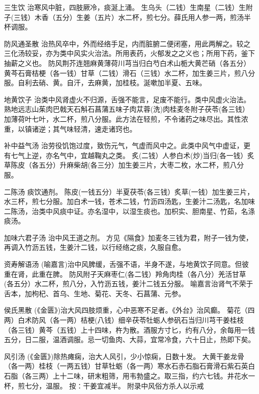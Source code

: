 \documentclass[a4paper,12pt,UTF8,twoside]{ctexbook}
\begin{document}
    三生饮
    治寒风中脏，四肢厥冷，痰涎上涌。
    生乌头（二钱）生南星（二钱）生附子(三钱）木香（五分）生姜（五片）水二杯，煎七分。薛氏用人参一两，煎汤半杯调服。
    
    防风通圣散
    治热风卒中，外而经络手足，内而脏腑二便闭塞，用此两解之。较之三化汤较妥，亦为类中风实火治法。所用表药，火郁发之之义也；所用下药，釜下抽薪之义也。
    防风荆芥连翘麻黄薄荷川芎当归白芍白术山栀大黄芒硝（各五分）黄芩石膏桔梗（各一钱）甘草（二钱）滑石（三钱）水二杯，加生姜三片，煎八分服。自利去硝、黄。自汗，去麻黄，加桂枝。涎嗽加半夏、五味。
    
    地黄饮子
    治类中风肾虚火不归源，舌强不能言，足废不能行。类中风虚火治法。
    熟地远志山茱肉巴戟天石斛石菖蒲五味子肉苁蓉(洗)肉桂麦冬附子茯苓(各三钱）加薄荷叶七叶，水二杯，煎八分服。此方法在轻煎，不令诸药之味尽出。其性浓重，以镇诸逆；其气味轻清，速走诸窍也。
    
    补中益气汤
    治劳役饥饱过度，致伤元气，气虚而风中之。此类中风气中虚证，更有七气上逆，亦名气中，宜越鞠丸之类。
    炙(二钱）人参白术(炒)当归(各一钱）炙草陈皮（各五分）升麻柴胡(各三分）加生姜三片，大枣二枚，水二杯，煎八分服。
    
    二陈汤
    痰饮通剂。
    陈皮(一钱五分）半夏茯苓(各三钱）炙草(一钱）加生姜三片，水三杯，煎七分服。加白术一钱，苍术二钱，竹沥四汤匙，生姜汁二汤匙，名加味二陈汤，治类中风痰中证。亦名湿中，以湿生痰也。加枳实、胆南星、竹茹，名涤痰汤。
    
    加味六君子汤
    治中风王道之剂。
    方见《隔食》加麦冬三钱为君，附子一钱为使，再调入竹沥五钱，生姜汁二钱，以行经络之痰，久服自愈。
    
    资寿解语汤
    (喻嘉言)治中风脾缓，舌强不语，半身不遂，与地黄饮子同意。但彼重在肾，此重在脾。
    防风附子天麻枣仁(各二钱）羚角肉桂（各八分）羌活甘草(各五分）水二杯，煎八分，入竹沥五钱，姜汁二钱五分服。
    喻嘉言治肾气不荣于舌本，加枸杞、首乌、生地、菊花、天冬、石菖蒲、元参。
    
    侯氏黑散
    (《金匮》)治大风四肢烦重，心中恶寒不足者。《外台》治风癫。
    菊花（四两）白术防风（各一两）桔梗(八钱）细辛茯苓牡蛎人参矾石当归川芎干姜桂枝（各三钱）黄芩（五钱）上十四味，杵为散。酒服方寸匕，约有八分，余每用一钱五分，日二服，温酒调服。忌一切鱼肉、大蒜，宜常冷食，六十日止，热即下矣。
    
    风引汤
    (《金匮》)除热瘫痫，治大人风引，少小惊痫，日数十发。
    大黄干姜龙骨（各一两）桂枝（一两五钱）甘草牡蛎（各一两）寒水石赤石脂石膏滑石紫石英白石脂（各三两）上十二味，研末粗筛，用韦勃盛之。取三指，约六七钱。井花水一杯，煎七分，温服。
    按∶干姜宜减半。
     附录中风俗方杀人以示戒	
    
\end{document}
